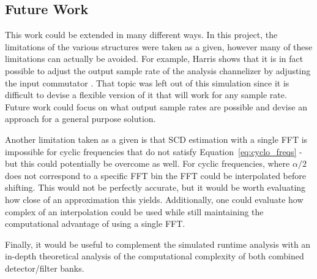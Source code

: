 \documentclass[12pt]{article}
\begin{document}
\subsection{Future Work}
This work could be extended in many different ways. In this project, the
limitations of the various structures were taken as a given, however many of
these limitations can actually be avoided. For example, Harris shows that it is
in fact possible to adjust the output sample rate of the analysis channelizer
by adjusting the input commutator \cite{Harris1}. That topic was left out of this
simulation since it is difficult to devise a flexible version of it that will
work for any sample rate. Future work could focus on what output sample rates
are possible and devise an approach for a general purpose solution.

Another limitation taken as a given is that SCD estimation with a single FFT is
impossible for cyclic frequencies that do not satisfy
Equation~\ref{eq:cyclo_freqs} - but this could potentially be overcome as well.
For cyclic frequencies, where $\alpha/2$ does not correspond to a specific FFT
bin the FFT could be interpolated before shifting. This would not be perfectly
accurate, but it would be worth evaluating how close of an approximation this
yields. Additionally, one could evaluate how complex of an interpolation could
be used while still maintaining the computational advantage of using a single FFT.


Finally, it would be useful to complement the simulated runtime analysis with
an in-depth theoretical analysis of the computational complexity of both
combined detector/filter banks. 


%
%
\end{document}
